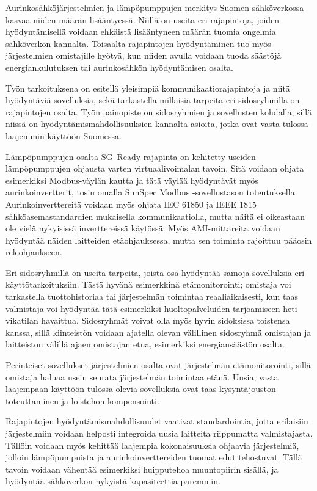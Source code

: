 Aurinkosähköjärjestelmien ja lämpöpumppujen merkitys Suomen sähköverkossa kasvaa niiden määrän lisääntyessä. Niillä on useita eri rajapintoja, joiden hyödyntämisellä voidaan ehkäistä lisääntyneen määrän tuomia ongelmia sähköverkon kannalta. Toisaalta rajapintojen hyödyntäminen tuo myös järjestelmien omistajille hyötyä, kun niiden avulla voidaan tuoda säästöjä energiankulutuksen tai aurinkosähkön hyödyntämisen osalta.

Työn tarkoituksena on esitellä yleisimpiä kommunikaatiorajapintoja ja niitä hyödyntäviä sovelluksia, sekä tarkastella millaisia tarpeita eri sidosryhmillä on rajapintojen osalta. Työn painopiste on sidosryhmien ja sovellusten kohdalla, sillä niissä on hyödyntämismahdollisuuksien kannalta asioita, jotka ovat vasta tulossa laajemmin käyttöön Suomessa. 

Lämpöpumppujen osalta SG--Ready-rajapinta on kehitetty useiden lämpöpumppujen ohjausta varten virtuaalivoimalan tavoin. Sitä voidaan ohjata esimerkiksi Modbus-väylän kautta ja tätä väylää hyödyntävät myös aurinkoinvertterit, tosin omalla SunSpec Modbus -sovellustason toteutuksella. Aurinkoinverttereitä voidaan myös ohjata IEC 61850 ja IEEE 1815 sähköasemastandardien mukaisella kommunikaatiolla, mutta näitä ei oikeastaan ole vielä nykyisissä inverttereissä käytössä. Myös AMI-mittareita voidaan hyödyntää näiden laitteiden etäohjauksessa, mutta sen toiminta rajoittuu pääosin releohjaukseen.

Eri sidosryhmillä on useita tarpeita, joista osa hyödyntää samoja sovelluksia eri käyttötarkoituksiin. Tästä hyvänä esimerkkinä etämonitorointi; omistaja voi tarkastella tuottohistoriaa tai järjestelmän toimintaa reaaliaikaisesti, kun taas valmistaja voi hyödyntää tätä esimerkiksi huoltopalveluiden tarjoamiseen heti vikatilan havaittua. Sidosryhmät voivat olla myös hyvin sidoksissa toistensa kanssa, sillä kiinteistön voidaan ajatella olevan välillinen sidosryhmä omistajan ja laitteiston välillä ajaen omistajan etua, esimerkiksi energiansäästön osalta.

Perinteiset sovellukset järjestelmien osalta ovat järjestelmän etämonitorointi, sillä omistaja haluaa usein seurata järjestelmän toimintaa etänä. Uusia, vasta laajempaan käyttöön tulossa olevia sovelluksia ovat taas kysyntäjouston toteuttaminen ja loistehon kompensointi. 

Rajapintojen hyödyntämismahdollisuudet vaativat standardointia, jotta erilaisiin järjestelmiin voidaan helposti integroida uusia laitteita riippumatta valmistajasta. Tällöin voidaan myös kehittää laajempia kokonaisuuksia ohjaavia järjestelmiä, jolloin lämpöpumpuista ja aurinkoinverttereiden tuomat edut tehostuvat. Tällä tavoin voidaan vähentää esimerkiksi huipputehoa muuntopiirin sisällä, ja hyödyntää sähköverkon nykyistä kapasiteettia paremmin.
